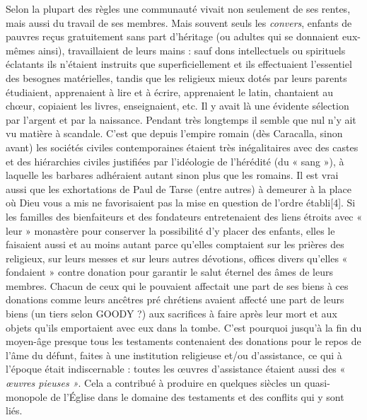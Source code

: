  Selon la plupart des règles une communauté vivait non seulement de ses rentes, mais aussi du travail de ses membres. Mais souvent seuls les \emph{convers}, enfants de pauvres reçus gratuitement sans part d'héritage (ou adultes qui se donnaient eux-mêmes ainsi), travaillaient de leurs mains : sauf dons intellectuels ou spirituels éclatants ils n'étaient instruits que superficiellement et ils effectuaient l'essentiel des besognes matérielles, tandis que les religieux mieux dotés par leurs parents étudiaient, apprenaient à lire et à écrire, apprenaient le latin, chantaient au chœur, copiaient les livres, enseignaient, etc. Il y avait là une évidente sélection par l'argent et par la naissance. Pendant très longtemps il semble que nul n'y ait vu matière à scandale. C'est que depuis l'empire romain (dès Caracalla, sinon avant) les sociétés civiles contemporaines étaient très inégalitaires avec des castes et des hiérarchies civiles justifiées par l'idéologie de l'hérédité (du « sang »), à laquelle les barbares adhéraient autant sinon plus que les romains. Il est vrai aussi que les exhortations de Paul de Tarse (entre autres) à demeurer à la place où Dieu vous a mis ne favorisaient pas la mise en question de l'ordre établi[4]. 
 Si les familles des bienfaiteurs et des fondateurs entretenaient des liens étroits avec « leur » monastère pour conserver la possibilité d'y placer des enfants, elles le faisaient aussi et au moins autant parce qu'elles comptaient sur les prières des religieux, sur leurs messes et sur leurs autres dévotions, offices divers qu'elles « fondaient » contre donation pour garantir le salut éternel des âmes de leurs membres. Chacun de ceux qui le pouvaient affectait une part de ses biens à ces donations comme leurs ancêtres pré chrétiens avaient affecté une part de leurs biens (un tiers selon GOODY ?) aux sacrifices à faire après leur mort et aux objets qu'ils emportaient avec eux dans la tombe. C'est pourquoi jusqu'à la fin du moyen-âge presque tous les testaments contenaient des donations pour le repos de l'âme du défunt, faites à une institution religieuse et/ou d'assistance, ce qui à l'époque était indiscernable : toutes les œuvres d'assistance étaient aussi des « \emph{œuvres pieuses »}. Cela a contribué à produire en quelques siècles un quasi-monopole de l'Église dans le domaine des testaments et des conflits qui y sont liés. 
 
